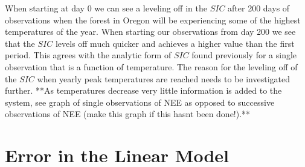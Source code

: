 \documentclass[11pt]{article}
\begin{document}
When starting at day 0 we can see a leveling off in the $SIC$ after 200 days of observations when the forest in Oregon will be experiencing  some of the highest temperatures of the year. When starting our observations from day 200 we see that the $SIC$ levels off much quicker and achieves a higher value than the first period. This agrees with the analytic form of $SIC$ found previously for a single observation that is a function of temperature. The reason for the leveling off of the $SIC$ when yearly peak temperatures are reached  needs to be investigated further. **As temperatures decrease very little information is added to the system, see graph of single observations of NEE as opposed to successive observations of NEE (make this graph if this hasnt been done!).**

\section*{Error in the Linear Model}
\end{document}
